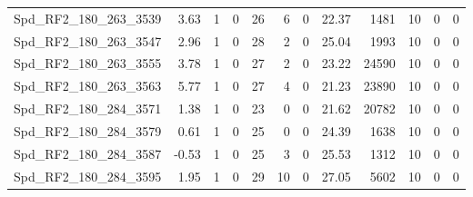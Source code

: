 \begin{longtable}[c]{@{}lrrrrrrrrrrr@{}}
Spd\_RF2\_180\_263\_3539     & 3.63                   & 1                       & 0                       & 26                     & 6                       & 0                       & 22.37                   & 1481                     & 10                       & 0                        & 0                        \\
Spd\_RF2\_180\_263\_3547     & 2.96                   & 1                       & 0                       & 28                     & 2                       & 0                       & 25.04                   & 1993                     & 10                       & 0                        & 0                        \\
Spd\_RF2\_180\_263\_3555     & 3.78                   & 1                       & 0                       & 27                     & 2                       & 0                       & 23.22                   & 24590                    & 10                       & 0                        & 0                        \\
Spd\_RF2\_180\_263\_3563     & 5.77                   & 1                       & 0                       & 27                     & 4                       & 0                       & 21.23                   & 23890                    & 10                       & 0                        & 0                        \\
Spd\_RF2\_180\_284\_3571     & 1.38                   & 1                       & 0                       & 23                     & 0                       & 0                       & 21.62                   & 20782                    & 10                       & 0                        & 0                        \\
Spd\_RF2\_180\_284\_3579     & 0.61                   & 1                       & 0                       & 25                     & 0                       & 0                       & 24.39                   & 1638                     & 10                       & 0                        & 0                        \\
Spd\_RF2\_180\_284\_3587     & -0.53                  & 1                       & 0                       & 25                     & 3                       & 0                       & 25.53                   & 1312                     & 10                       & 0                        & 0                        \\
Spd\_RF2\_180\_284\_3595     & 1.95                   & 1                       & 0                       & 29                     & 10                      & 0                       & 27.05                   & 5602                     & 10                       & 0                        & 0                        \\

\end{longtable}
